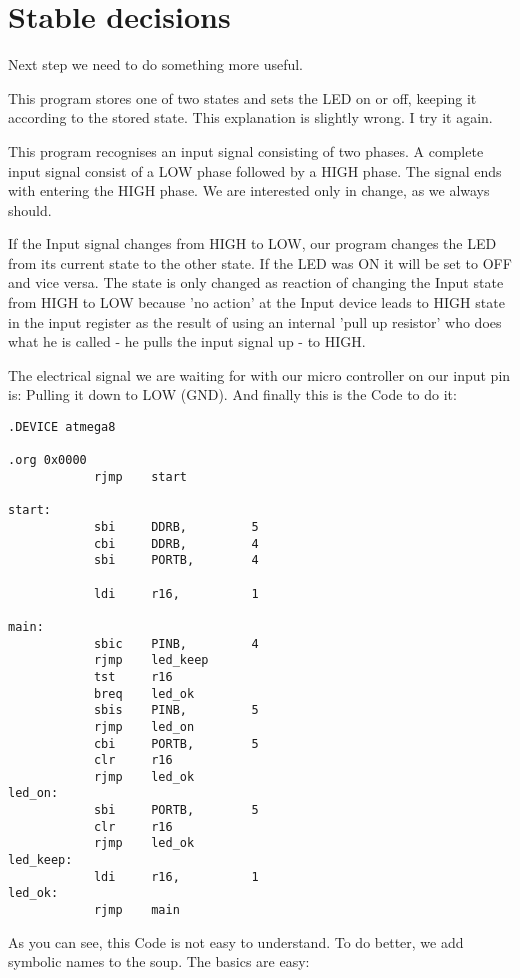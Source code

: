 \section{Stable decisions}

Next step we need to do something more useful.

This program stores one of two states and sets the LED on or off, keeping it according to the stored state. This explanation is slightly wrong. I try it again.

This program recognises an input signal consisting of two phases. A complete input signal consist of a LOW phase followed by a HIGH phase. The signal ends with entering the HIGH phase. We are interested only in change, as we always should.

If the Input signal changes from HIGH to LOW, our program changes the LED from its current state to the other state. If the LED was ON it will be set to OFF and vice versa. The state is only changed as reaction of changing the Input state from HIGH to LOW because 'no action' at the Input device leads to HIGH state in the input register as the result of using an internal 'pull up resistor' who does what he is called - he pulls the input signal up - to HIGH.

The electrical signal we are waiting for with our micro controller on our input pin is: Pulling it down to LOW (GND). And finally this is the Code to do it:

\begin{lstlisting}
.DEVICE atmega8

.org 0x0000
            rjmp    start

start:
            sbi     DDRB,         5
            cbi     DDRB,         4
            sbi     PORTB,        4

            ldi     r16,          1

main:
            sbic    PINB,         4
            rjmp    led_keep
            tst     r16
            breq    led_ok
            sbis    PINB,         5
            rjmp    led_on
            cbi     PORTB,        5
            clr     r16
            rjmp    led_ok
led_on:
            sbi     PORTB,        5
            clr     r16
            rjmp    led_ok
led_keep:
            ldi     r16,          1
led_ok:
            rjmp    main
\end{lstlisting}


As you can see, this Code is not easy to understand. To do better, we add symbolic names to the soup. The basics are easy:

